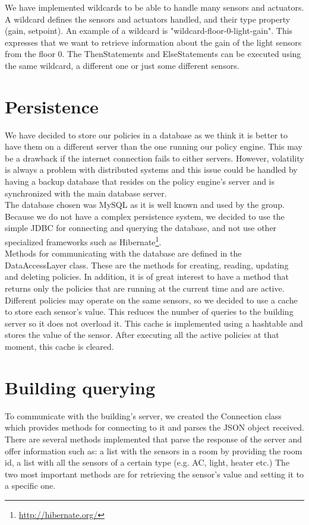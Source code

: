 We have implemented wildcards to be able to handle many sensors and actuators. A wildcard defines the sensors and actuators handled, and their type property (gain, setpoint). An example of a wildcard is "wildcard-floor-0-light-gain". This expresses that we want to retrieve information about the gain of the light sensors from the floor 0. The ThenStatements and ElseStatements can be executed using the same wildcard, a different one or just some different sensors. 

\section{Persistence}
We have decided to store our policies in a database as we think it is better to have them on a different server than the one running our policy engine. This may be a drawback if the internet connection fails to either servers. However, volatility is always a problem with distributed systems and this issue could be handled by having a backup database that resides on the policy engine's server and is synchronized with the main database server.
\\The database chosen was MySQL as it is well known and used by the group. Because we do not have a complex persistence system, we decided to use the simple JDBC for connecting and querying the database, and not use other specialized frameworks such as Hibernate\footnote{\url{http://hibernate.org/}}. 
\\Methods for communicating with the database are defined in the DataAccessLayer class. These are the methods for creating, reading, updating and deleting policies. In addition, it is of great interest to have a method that returns only the policies that are running at the current time and are active. 
\\Different policies may operate on the same sensors, so we decided to use a cache to store each sensor's value. This reduces the number of queries to the building server so it does not overload it. This cache is implemented using a hashtable and stores the value of the sensor. After executing all the active policies at that moment, this cache is cleared. 

\section{Building querying}
To communicate with the building's server, we created the Connection class which provides methods for connecting to it and parses the JSON object received. There are several methods implemented that parse the response of the server and offer information such as: a list with the sensors in a room by providing the room id, a list with all the sensors of a certain type (e.g. AC, light, heater etc.) The two most important methods are for retrieving the sensor's value and setting it to a specific one. 

